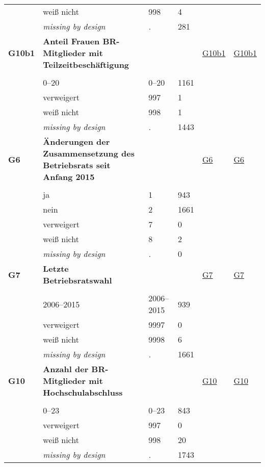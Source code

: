 \begin{longtable}{| L{2.45cm} | L{6cm} | C{1.5cm} | R{1cm} | C{2.25cm} | C{2.25cm} |}
   & weiß nicht & 998 & 4 &  &  \\ 
   & \textit{missing by design} & \textit{.} & 281 &  &  \\ 
   \midrule
\textbf{G10b1}\label{var:G10b1} & \textbf{Anteil Frauen BR-Mitglieder mit Teilzeitbeschäftigung} &  &  & \hyperref[G10b1]{G10b1} & \hyperref[var:suf:G10b1]{G10b1} \\ 
   &  &  &  &  &  \\ 
   & 0--20 & 0--20 & 1161 &  &  \\ 
   & verweigert & 997 & 1 &  &  \\ 
   & weiß nicht & 998 & 1 &  &  \\ 
   & \textit{missing by design} & \textit{.} & 1443 &  &  \\ 
   \midrule
\textbf{G6}\label{var:G6} & \textbf{Änderungen der Zusammensetzung des Betriebsrats seit Anfang 2015} &  &  & \hyperref[G6]{G6} & \hyperref[var:suf:G6]{G6} \\ 
   &  &  &  &  &  \\ 
   & ja & 1 & 943 &  &  \\ 
   & nein & 2 & 1661 &  &  \\ 
   & verweigert & 7 & 0 &  &  \\ 
   & weiß nicht & 8 & 2 &  &  \\ 
   & \textit{missing by design} & \textit{.} & 0 &  &  \\ 
   \midrule
\textbf{G7}\label{var:G7} & \textbf{Letzte Betriebsratswahl} &  &  & \hyperref[G7]{G7} & \hyperref[var:suf:G7]{G7} \\ 
   &  &  &  &  &  \\ 
   & 2006--2015 & 2006--2015 & 939 &  &  \\ 
   & verweigert & 9997 & 0 &  &  \\ 
   & weiß nicht & 9998 & 6 &  &  \\ 
   & \textit{missing by design} & \textit{.} & 1661 &  &  \\ 
   \midrule
\textbf{G10}\label{var:G10} & \textbf{Anzahl der BR-Mitglieder mit Hochschulabschluss} &  &  & \hyperref[G10]{G10} & \hyperref[var:suf:G10]{G10} \\ 
   &  &  &  &  &  \\ 
   & 0--23 & 0--23 & 843 &  &  \\ 
   & verweigert & 997 & 0 &  &  \\ 
   & weiß nicht & 998 & 20 &  &  \\ 
   & \textit{missing by design} & \textit{.} & 1743 &  &  \\ 

\end{longtable}

